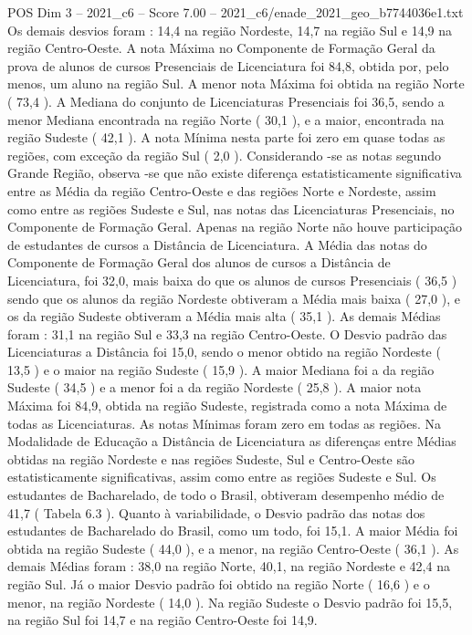 \begin{textsample}{POS Dim 3 – 2021\_c6 – Score 7.00 – 2021\_c6/enade\_2021\_geo\_b7744036e1.txt}
Os demais desvios foram : 14,4 na região Nordeste, 14,7 na região Sul e 14,9 na região Centro-Oeste.
A nota Máxima no Componente de Formação Geral da prova de alunos de cursos Presenciais de Licenciatura foi 84,8, obtida por, pelo menos, um aluno na região Sul.
A menor nota Máxima foi obtida na região Norte ( 73,4 ).
A Mediana do conjunto de Licenciaturas Presenciais foi 36,5, sendo a menor Mediana encontrada na região Norte ( 30,1 ), e a maior, encontrada na região Sudeste ( 42,1 ).
A nota Mínima nesta parte foi zero em quase todas as regiões, com exceção da região Sul ( 2,0 ).
Considerando -se as notas segundo Grande Região, observa -se que não existe diferença estatisticamente significativa entre as Média da região Centro-Oeste e das regiões Norte e Nordeste, assim como entre as regiões Sudeste e Sul, nas notas das Licenciaturas Presenciais, no Componente de Formação Geral.
Apenas na região Norte não houve participação de estudantes de cursos a Distância de Licenciatura.
A Média das notas do Componente de Formação Geral dos alunos de cursos a Distância de Licenciatura, foi 32,0, mais baixa do que os alunos de cursos Presenciais ( 36,5 ) sendo que os alunos da região Nordeste obtiveram a Média mais baixa ( 27,0 ), e os da região Sudeste obtiveram a Média mais alta ( 35,1 ).
As demais Médias foram : 31,1 na região Sul e 33,3 na região Centro-Oeste.
O Desvio padrão das Licenciaturas a Distância foi 15,0, sendo o menor obtido na região Nordeste ( 13,5 ) e o maior na região Sudeste ( 15,9 ).
A maior Mediana foi a da região Sudeste ( 34,5 ) e a menor foi a da região Nordeste ( 25,8 ).
A maior nota Máxima foi 84,9, obtida na região Sudeste, registrada como a nota Máxima de todas as Licenciaturas.
As notas Mínimas foram zero em todas as regiões.
Na Modalidade de Educação a Distância de Licenciatura as diferenças entre Médias obtidas na região Nordeste e nas regiões Sudeste, Sul e Centro-Oeste são estatisticamente significativas, assim como entre as regiões Sudeste e Sul.
Os estudantes de Bacharelado, de todo o Brasil, obtiveram desempenho médio de 41,7 ( Tabela 6.3 ).
Quanto à variabilidade, o Desvio padrão das notas dos estudantes de Bacharelado do Brasil, como um todo, foi 15,1.
A maior Média foi obtida na região Sudeste ( 44,0 ), e a menor, na região Centro-Oeste ( 36,1 ).
As demais Médias foram : 38,0 na região Norte, 40,1, na região Nordeste e 42,4 na região Sul.
Já o maior Desvio padrão foi obtido na região Norte ( 16,6 ) e o menor, na região Nordeste ( 14,0 ).
Na região Sudeste o Desvio padrão foi 15,5, na região Sul foi 14,7 e na região Centro-Oeste foi 14,9.

\end{textsample}
